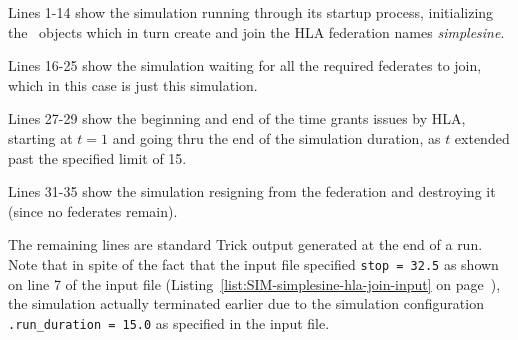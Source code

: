 Lines 1-14 show the simulation running through its startup process,
initializing the \TrickHLA\ objects which in turn create and join
the HLA federation names {\em simplesine}.

Lines 16-25 show the simulation waiting for all the required federates to join,
which in this case is just this simulation.

Lines 27-29 show the beginning and end of the time grants issues by HLA,
starting at $t=1$ and going thru the end of the simulation duration,
as $t$ extended past the specified limit of 15.

Lines 31-35 show the simulation resigning from the federation and
destroying it (since no federates remain).

The remaining lines are standard Trick output generated at the end of a run.
Note that in spite of the fact that the input file specified
{\tt stop = 32.5} as shown on line 7 of the input file
(Listing~\ref{list:SIM-simplesine-hla-join-input} on page~\pageref{list:SIM-simplesine-hla-join-input}),
the simulation actually terminated earlier due to the
simulation configuration {\tt .run\_duration = 15.0} as specified in
the input file.
